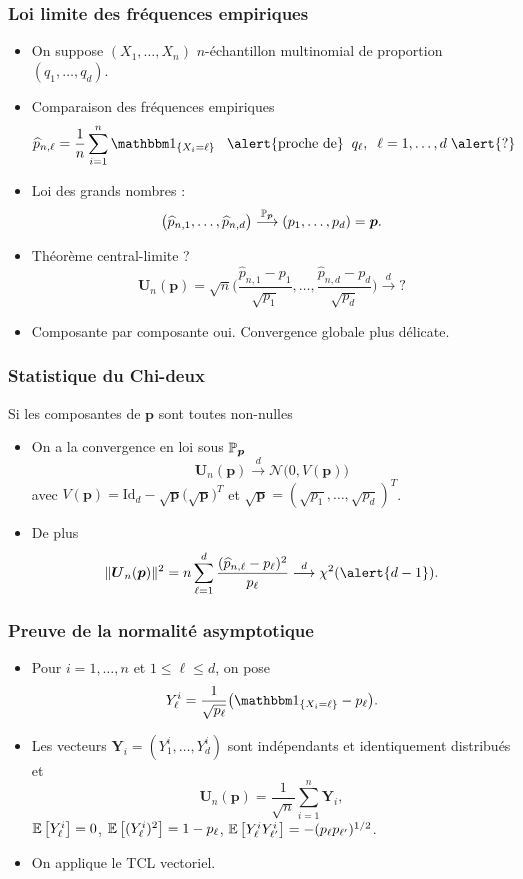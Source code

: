 \begin{frame}
\frametitle{Loi limite des fréquences empiriques}
\begin{itemize}
\item On suppose $(X_1,\dots,X_n)$ $n$-échantillon multinomial de proportion $(q_1,\dots,q_d)$.
\item \alert{Comparaison des fréquences empiriques}
$$\widehat p_{n,\ell}=\frac{1}{n}\sum_{i=1}^n \indi{X_i=\ell}\;\;\;\text{\alert{proche de}}\;\;q_\ell,\;\;\ell=1,\ldots, d\; \alert{?}$$
\item Loi des grands nombres :
$$\big(\widehat p_{n,1},\ldots, \widehat p_{n,d}\big) \stackrel{\operatorname{{\mathbb P}}_{{\boldsymbol p}}}{\longrightarrow} (p_1,\ldots, p_d)={\boldsymbol p}.$$
\item \alert{Théorème central-limite ?}
$${\boldsymbol{U}_n}(\boldsymbol{p})=\sqrt{n}\Big(\frac{\widehat p_{n,1}-p_1}{\sqrt{p_1}},\ldots, \frac{\widehat p_{n,d}-p_d}{\sqrt{p_d}}\Big) \stackrel{d}{\longrightarrow} ?$$
\item Composante par composante oui. \alert{Convergence globale plus délicate}.
\end{itemize}
\end{frame}

\begin{frame}
\frametitle{Statistique du Chi-deux}
\begin{prop}
Si les composantes de $\boldsymbol{p}$ sont toutes non-nulles
\begin{itemize}
\item On a la \alert{convergence en loi} sous $\operatorname{{\mathbb P}}_{\boldsymbol{p}}$
$${\boldsymbol{U}_n}(\boldsymbol{p})\stackrel{d}{\longrightarrow} {\mathcal N}\big(0,V(\boldsymbol{p})\big)$$
avec $V(\boldsymbol{p}) = \mathrm{Id}_d-\sqrt{\boldsymbol{p}}\big(\sqrt{\boldsymbol{p}}\big)^T$ et $\sqrt{\boldsymbol{p}} = (\sqrt{p_1},\ldots, \sqrt{p_d})^T$.
\item \alert{De plus}
$$\|{\boldsymbol{U}_n}(\boldsymbol{p})\|^2 = n\sum_{\ell=1}^d \frac{(\widehat p_{n,\ell}-p_\ell)^2}{p_\ell} \stackrel{d}{\longrightarrow} \chi^2(\alert{d-1}).$$
\end{itemize}
\end{prop}
\end{frame}

\begin{frame}
\frametitle{Preuve de la normalité asymptotique}
\begin{itemize}
\item Pour $i=1,\ldots, n$ et $1 \leq \ell \leq d$, on pose
$$Y_\ell^i=\frac{1}{\sqrt{p_\ell}}\big(\indi{X_i=\ell}-p_\ell\big).$$
\item Les vecteurs ${\boldsymbol Y}_i=(Y_1^i,\ldots, Y_d^i)$ sont \alert{indépendants et identiquement distribués} et
$${\boldsymbol U}_n(\boldsymbol{p}) = \frac{1}{\sqrt{n}}\sum_{i = 1}^n {\boldsymbol Y}_i,$$
$\operatorname{{\mathbb E}}\big[Y_\ell^i\big]=0$, $\operatorname{{\mathbb E}}\big[(Y_\ell^i)^2\big]=1-p_\ell$, $\operatorname{{\mathbb E}}\big[Y_\ell^iY_{\ell'}^i \big]=-(p_\ell p_{\ell'})^{1/2}$.
\item \alert{On applique le TCL vectoriel}.
\end{itemize}
\end{frame}

